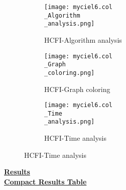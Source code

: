\documentclass[10pt]{article}
\begin{document}
\graphicspath{{./Core1/Solutions/HCFI/myciel6.col}}
\begin{figure}[H]
\begin{subfigure}{.33\textwidth}
  \centering
  \texttt{[image: myciel6.col\\\_Algorithm\\\_analysis.png]}
  \caption{HCFI-Algorithm analysis}
   \label{fig:subfig1}
\end{subfigure}%
\begin{subfigure}{.33\textwidth}
  \centering
  \texttt{[image: myciel6.col\\\_Graph\\\_coloring.png]}
  \caption{HCFI-Graph coloring}
  \label{fig:subfig2}
\end{subfigure}
\begin{subfigure}{.33\textwidth}
  \centering
  \texttt{[image: myciel6.col\\\_Time\\\_analysis.png]}
  \caption{HCFI-Time analysis}
  \end{subfigure}
\end{figure}
\vspace{2cm}
\begin{center}
\hyperlink{page.8}{\textbf{Results}}\\
\vspace{0.5cm}
\hyperlink{page.71}{\textbf{Compact Results Table}}
\end{center}
\pagebreak
\end{document}
